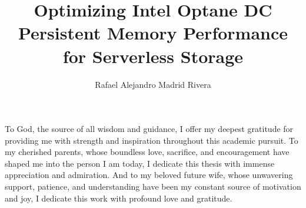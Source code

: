 \documentclass[11pt]{report}
\begin{document}
\title{Optimizing Intel Optane DC Persistent Memory Performance\\
            for Serverless Storage}
\author{Rafael Alejandro Madrid Rivera}




\makeatletter
{}
\makeatother
           


\signaturepage

\titlepage

\copyrightpage


\dedicationpage

\noindent To God, the source of all wisdom and guidance, I offer my deepest gratitude for providing me with strength and inspiration throughout this academic pursuit. To my cherished parents, whose boundless love, sacrifice, and encouragement have shaped me into the person I am today, I dedicate this thesis with immense appreciation and admiration. And to my beloved future wife, whose unwavering support, patience, and understanding have been my constant source of motivation and joy, I dedicate this work with profound love and gratitude.
\end{document}
